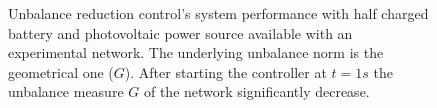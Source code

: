 \begin{figure}[ht]

                 \caption{Unbalance reduction control's system performance with half charged battery and photovoltaic power source available with an experimental network. The underlying unbalance norm is the geometrical one ($G$). After starting the controller at $t=1s$ the unbalance measure $G$ of the network significantly decrease.}
                 \label{fig:compare_asym_PV}
                \end{figure}
            
              
              



